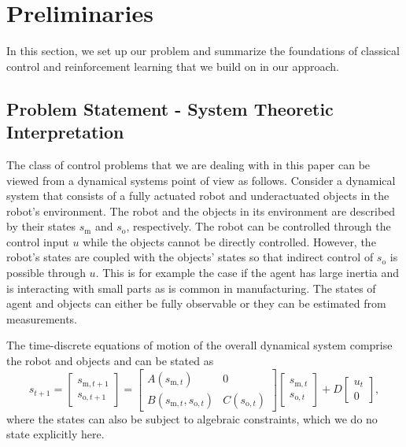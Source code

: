 \section{Preliminaries}\label{sec:background}
In this section, we set up our problem and summarize the foundations of classical control and reinforcement learning that we build on in our approach.

\subsection{Problem Statement - System Theoretic Interpretation}
%
The class of control problems that we are dealing with in this paper can be viewed from a dynamical systems point of view as follows.
Consider a dynamical system that consists of a fully actuated robot and underactuated objects in the robot's environment.
The robot and the objects in its environment are described by their states $s_\text{m}$ and $s_\text{o}$, respectively. 
The robot can be controlled through the control input $u$ while the objects cannot be directly controlled.
However, the robot's states are coupled with the objects' states so that indirect control of $s_\text{o}$ is possible through $u$.
This is for example the case if the agent has large inertia and is interacting with small parts as is common in manufacturing.
The states of agent and objects can either be fully observable or they can be estimated from measurements.

The time-discrete equations of motion of the overall dynamical system comprise the robot and objects and can be stated as
%
\begin{equation}
\label{eq:eom}
    s_{t+1}=\begin{bmatrix}s_{\text{m},t+1} \\ s_{\text{o}, t+1}\end{bmatrix}
    =\begin{bmatrix}A(s_{\text{m},t}) & 0 \\ B(s_{\text{m},t}, s_{\text{o},t}) & C(s_{\text{o},t})\end{bmatrix}\begin{bmatrix}s_{\text{m},t} \\ s_{\text{o},t}\end{bmatrix}  + D\begin{bmatrix}u_t \\ 0\end{bmatrix},
\end{equation}
%
where the states can also be subject to algebraic constraints, which we do no state explicitly here.

